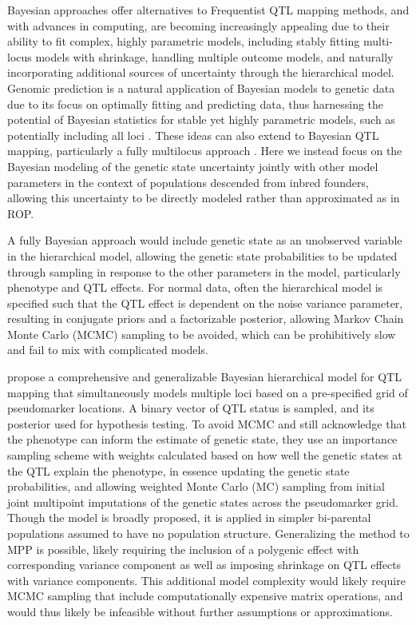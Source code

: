 Bayesian approaches offer alternatives to Frequentist QTL mapping methods, and with advances in computing, are becoming increasingly appealing due to their ability to fit complex, highly parametric models, including stably fitting multi-locus models with shrinkage, handling multiple outcome models, and naturally incorporating additional sources of uncertainty through the hierarchical model. Genomic prediction is a natural application of Bayesian models to genetic data due to its focus on optimally fitting and predicting data, thus harnessing the potential of Bayesian statistics for stable yet highly parametric models, such as potentially including all loci \citep{Meuwissen2001, Xu2003, Yi2008}. These ideas can also extend to Bayesian QTL mapping, particularly a fully multilocus approach \citep{Crawford2015}. Here we instead focus on the Bayesian modeling of the genetic state uncertainty jointly with other model parameters in the context of populations descended from inbred founders, allowing this uncertainty to be directly modeled rather than approximated as in ROP. 

A fully Bayesian approach would include genetic state as an unobserved variable in the hierarchical model, allowing the genetic state probabilities to be updated through sampling in response to the other parameters in the model, particularly phenotype and QTL effects. For normal data, often the hierarchical model is specified such that the QTL effect is dependent on the noise variance parameter, resulting in conjugate priors \citep{Servin2007} and a factorizable posterior, allowing Markov Chain Monte Carlo (MCMC) sampling to be avoided, which can be prohibitively slow and fail to mix with complicated models. 

\cite{Sen2001} propose a comprehensive and generalizable Bayesian hierarchical model for QTL mapping that simultaneously models multiple loci based on a pre-specified grid of pseudomarker locations. A binary vector of QTL status is sampled, and its posterior used for hypothesis testing. To avoid MCMC and still acknowledge that the phenotype can inform the estimate of genetic state, they use an importance sampling scheme with weights calculated based on how well the genetic states at the QTL explain the phenotype, in essence updating the genetic state probabilities, and allowing weighted Monte Carlo (MC) sampling from initial joint multipoint imputations of the genetic states across the pseudomarker grid. Though the model is broadly proposed, it is applied in simpler bi-parental populations assumed to have no population structure. Generalizing the method to MPP is possible, likely requiring the inclusion of a polygenic effect with corresponding variance component as well as imposing shrinkage on QTL effects with variance components. This additional model complexity would likely require MCMC sampling that include computationally expensive matrix operations, and would thus likely be infeasible without further assumptions or approximations.

